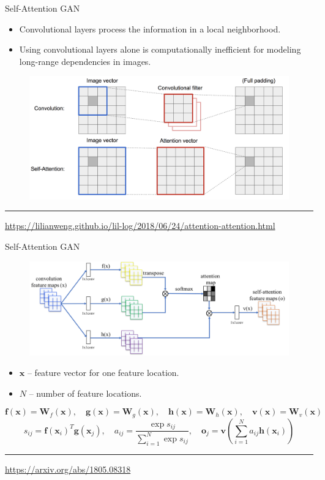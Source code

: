 \documentclass{beamer}
\newcommand{\bx}{\mathbf{x}}
\newcommand{\bW}{\mathbf{W}}
\begin{document}
\begin{frame}{Self-Attention GAN}
	\begin{itemize}
		\item Convolutional layers process the information in a local neighborhood.
		\item Using convolutional layers alone is computationally inefficient for modeling long-range dependencies in images.
	\end{itemize}
	\begin{figure}
		\centering
		\includegraphics[width=0.9\linewidth]{figs/conv-vs-sa}
	\end{figure}
	\vfill
	\hrule\medskip 
	{\scriptsize \href{https://lilianweng.github.io/lil-log/2018/06/24/attention-attention.html}{https://lilianweng.github.io/lil-log/2018/06/24/attention-attention.html}}
\end{frame}
\begin{frame}{Self-Attention GAN}
	\begin{figure}
		\centering
		\includegraphics[width=0.9\linewidth]{figs/self-attention}
	\end{figure}
	\vspace{-0.2cm}
	\begin{itemize}
		\item $\bx$ -- feature vector for one feature location.
		\item $N$ -- number of feature locations.
	\end{itemize}
	\vspace{0.5cm}
	\[
		\mathbf{f}(\bx) = \bW_f(\bx), \quad \mathbf{g}(\bx) = \bW_g(\bx), \quad \mathbf{h}(\bx) = \bW_h(\bx), \quad \mathbf{v}(\bx) = \bW_v(\bx)
	\]
	\[
		s_{ij} = \mathbf{f}(\bx_i)^T \mathbf{g}(\bx_j), \quad a_{ij} = \frac{\exp{s_{ij}}}{\sum_{i=1}^N \exp{s_{ij}}}, \quad \textbf{o}_j = \textbf{v}\left( \sum_{i=1}^N a_{ij} \mathbf{h}(\bx_i) \right)
	\]
	\vfill
	\hrule\medskip 
	{\scriptsize \href{https://arxiv.org/abs/1805.08318}{https://arxiv.org/abs/1805.08318}}
\end{frame}
\end{document}
